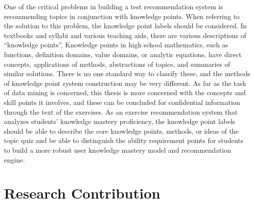 One of the critical problems in building a test recommendation system is recommending topics in conjunction with knowledge points. When referring to the solution to this problem, the knowledge point labels should be considered. In textbooks and syllabi and various teaching aids, there are various descriptions of ``knowledge points''. Knowledge points in high school mathematics, such as functions, definition domains, value domains, or analytic equations, have direct concepts, applications of methods, abstractions of topics, and summaries of similar solutions. There is no one standard way to classify these, and the methods of knowledge point system construction may be very different. As far as the task of data mining is concerned, this thesis is more concerned with the concepts and skill points it involves, and these can be concluded for confidential information through the text of the exercises. As an exercise recommendation system that analyzes students' knowledge mastery proficiency, the knowledge point labels should be able to describe the core knowledge points, methods, or ideas of the topic quiz and be able to distinguish the ability requirement points for students to build a more robust user knowledge mastery model and recommendation engine.

\section{Research Contribution}

